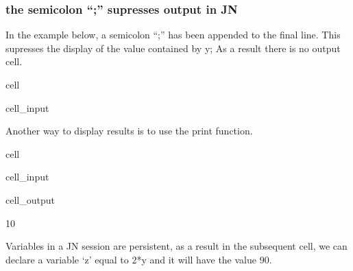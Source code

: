 \documentclass[letterpaper,10pt,english]{jupyterBook}
\begin{document}
\subsubsection{the semi\sphinxhyphen{}colon “;” supresses output in JN}
\label{\detokenize{content/04_PythonEssentials/Intro_Jupyter_notebook:the-semi-colon-supresses-output-in-jn}}
\sphinxAtStartPar
In the example below, a semi\sphinxhyphen{}colon “;” has been appended to the final line.  This supresses the display of the value contained by y;  As a result there is no output cell.

\begin{sphinxuseclass}{cell}\begin{sphinxVerbatimInput}

\begin{sphinxuseclass}{cell_input}
\begin{sphinxVerbatim}[commandchars=\\\{\}]
  
  
\end{sphinxVerbatim}

\end{sphinxuseclass}\end{sphinxVerbatimInput}

\end{sphinxuseclass}
\sphinxAtStartPar
Another way to display results is to use the print function.

\begin{sphinxuseclass}{cell}\begin{sphinxVerbatimInput}

\begin{sphinxuseclass}{cell_input}
\begin{sphinxVerbatim}[commandchars=\\\{\}]
  
\end{sphinxVerbatim}

\end{sphinxuseclass}\end{sphinxVerbatimInput}
\begin{sphinxVerbatimOutput}

\begin{sphinxuseclass}{cell_output}
\begin{sphinxVerbatim}[commandchars=\\\{\}]
10
\end{sphinxVerbatim}

\end{sphinxuseclass}\end{sphinxVerbatimOutput}

\end{sphinxuseclass}
\sphinxAtStartPar
Variables in a JN session are persistent, as a result in the subsequent cell, we can declare a variable ‘z’ equal to 2*y and it will have the value 90.
\end{document}
